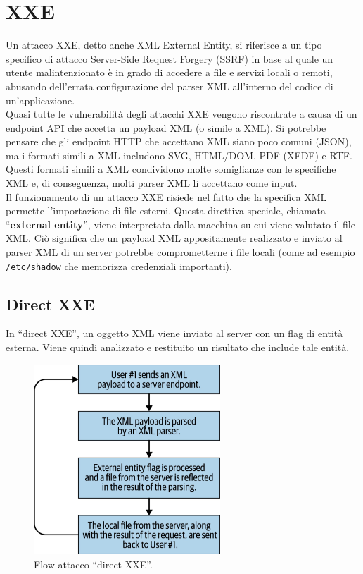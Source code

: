 \chapter{XXE}

Un attacco XXE, detto anche XML External Entity, si riferisce a un tipo specifico di attacco Server-Side Request Forgery (SSRF) in base al quale un utente malintenzionato è in grado di accedere a file e servizi locali o remoti, abusando dell'errata configurazione del parser XML all'interno del codice di un'applicazione.\\ 

Quasi tutte le vulnerabilità degli attacchi XXE vengono riscontrate a causa di un endpoint API che accetta un payload XML (o simile a XML). Si potrebbe pensare che gli endpoint HTTP che accettano XML siano poco comuni (JSON), ma i formati simili a XML includono SVG, HTML/DOM, PDF (XFDF) e RTF. Questi formati simili a XML condividono molte somiglianze con le specifiche XML e, di conseguenza,
molti parser XML li accettano come input.\\

Il funzionamento di un attacco XXE risiede nel fatto che la specifica XML permette l'importazione di file esterni. Questa direttiva speciale, chiamata ``\textbf{external entity}'', viene interpretata dalla macchina su cui viene valutato il file XML. Ciò significa che un payload XML appositamente
realizzato e inviato al parser XML di un server potrebbe
comprometterne i file locali (come ad esempio \verb|/etc/shadow| che memorizza credenziali importanti).

\newpage

\section{Direct XXE}
In ``direct XXE'', un oggetto XML viene inviato al server con un flag di entità esterna. Viene quindi analizzato e restituito un risultato che include tale entità.

\begin{figure}[H]
	\centering
	\includegraphics[width=7cm, keepaspectratio]{capitoli/web_security/imgs/direct_xxe_flow.png}
	\caption{Flow attacco ``direct XXE''.}
	\label{fig:direct_xxe_flow}
\end{figure}

